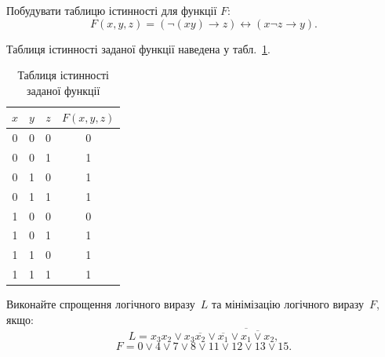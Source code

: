 \documentclass[a4paper,oneside,DIV=12,12pt]{scrartcl}
\renewcommand{\implies}{\rightarrow}
\newcommand\barneg[1]{\overline{#1}}
\newcommand{\logicequiv}{\leftrightarrow}
\begin{document}
	\begin{exercise}
		Побудувати таблицю істинності для функції $F$:
		\[
			F(x, y, z) = \left( \neg{(xy)} \implies z\right) \logicequiv \left( x \neg{z} \implies y \right).
		\]
	\end{exercise}
	
	\begin{solution}
		Таблиця істинності заданої функції наведена у табл.~\ref{tab:ex2-truth-table}.
		
		\begin{table}[!htbp]
		\centering
			\begin{tabular}{cccc}
				\toprule
					$x$ & $y$ & $z$ & $F(x, y, z)$\\
				\midrule
					0   & 0   & 0   & 0\\
					0   & 0   & 1   & 1\\
					0   & 1   & 0   & 1\\
					0   & 1   & 1   & 1\\
					1   & 0   & 0   & 0\\
					1   & 0   & 1   & 1\\
					1   & 1   & 0   & 1\\
					1   & 1   & 1   & 1\\
				\bottomrule
			\end{tabular}
		\caption{Таблиця істинності заданої функції}
		\label{tab:ex2-truth-table}
		\end{table}
	\end{solution}
	
	\begin{exercise}
		Виконайте спрощення логічного виразу~$L$ та мінімізацію логічного виразу~$F$, якщо:
		\[
			L = x_3x_2 \lor x_3 \barneg{x_2} \lor \barneg{\barneg{x_1} \lor \barneg{x_1 \lor x_2} },
		\]
		\[
			F = 0 \lor 4 \lor 7 \lor 8 \lor 11 \lor 12 \lor 13 \lor 15.
		\]
	\end{exercise}
	
\end{document}
